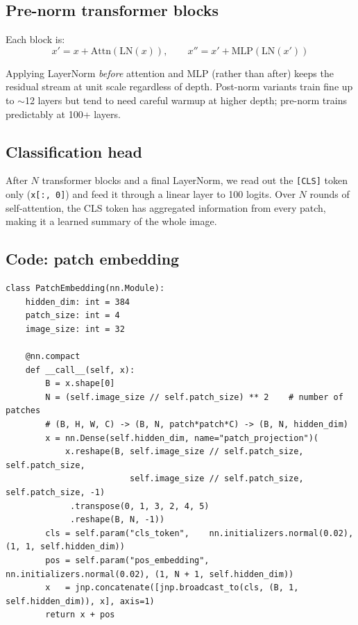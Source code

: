 \documentclass[11pt,a4paper]{article}
\begin{document}
\subsection{Pre-norm transformer blocks}

Each block is:
$$x' = x + \text{Attn}(\text{LN}(x)), \qquad x'' = x' + \text{MLP}(\text{LN}(x'))$$

\begin{keypoint}
Applying LayerNorm \emph{before} attention and MLP (rather than after) keeps the residual
stream at unit scale regardless of depth. Post-norm variants train fine up to $\sim$12
layers but tend to need careful warmup at higher depth; pre-norm trains predictably at
100+ layers.
\end{keypoint}

\subsection{Classification head}

After $N$ transformer blocks and a final LayerNorm, we read out the \texttt{[CLS]} token only
(\texttt{x[:, 0]}) and feed it through a linear layer to 100 logits. Over $N$ rounds of
self-attention, the CLS token has aggregated information from every patch, making it a
learned summary of the whole image.

\subsection{Code: patch embedding}

\begin{lstlisting}[style=py]
class PatchEmbedding(nn.Module):
    hidden_dim: int = 384
    patch_size: int = 4
    image_size: int = 32

    @nn.compact
    def __call__(self, x):
        B = x.shape[0]
        N = (self.image_size // self.patch_size) ** 2    # number of patches
        # (B, H, W, C) -> (B, N, patch*patch*C) -> (B, N, hidden_dim)
        x = nn.Dense(self.hidden_dim, name="patch_projection")(
            x.reshape(B, self.image_size // self.patch_size, self.patch_size,
                         self.image_size // self.patch_size, self.patch_size, -1)
             .transpose(0, 1, 3, 2, 4, 5)
             .reshape(B, N, -1))
        cls = self.param("cls_token",    nn.initializers.normal(0.02), (1, 1, self.hidden_dim))
        pos = self.param("pos_embedding", nn.initializers.normal(0.02), (1, N + 1, self.hidden_dim))
        x   = jnp.concatenate([jnp.broadcast_to(cls, (B, 1, self.hidden_dim)), x], axis=1)
        return x + pos
\end{lstlisting}
\end{document}
